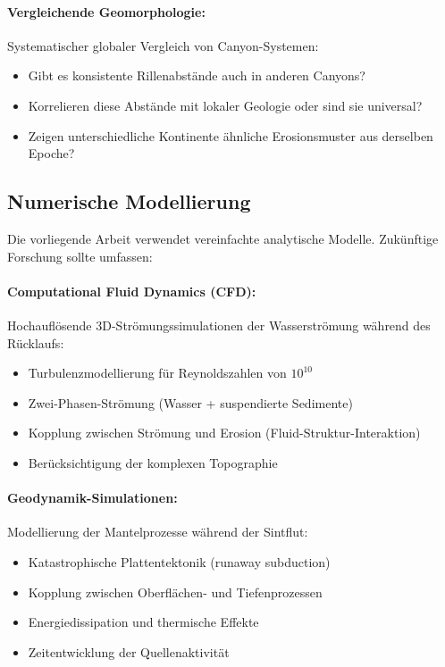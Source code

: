 ﻿\documentclass[12pt,a4paper]{report}
\begin{document}
\paragraph{Vergleichende Geomorphologie:}
Systematischer globaler Vergleich von Canyon-Sys\-temen:
\begin{itemize}
	\item Gibt es konsistente Rillenabstände auch in anderen Canyons?
	\item Korrelieren diese Abstände mit lokaler Geologie oder sind sie universal?
	\item Zeigen unterschiedliche Kontinente ähnliche Erosionsmuster aus derselben Epoche?
\end{itemize}

\subsection{Numerische Modellierung}

Die vorliegende Arbeit verwendet vereinfachte analytische Modelle. Zukünftige Forschung sollte umfassen:

\paragraph{Computational Fluid Dynamics (CFD):}
Hochauflösende 3D-Strömungssimulationen der Wasserströmung während des Rücklaufs:
\begin{itemize}
	\item Turbulenzmodellierung für Reynoldszahlen von $10^{10}$
	\item Zwei-Phasen-Strömung (Wasser + suspendierte Sedimente)
	\item Kopplung zwischen Strömung und Erosion (Fluid-Struktur-Interaktion)
	\item Berücksichtigung der komplexen Topographie
\end{itemize}

\paragraph{Geodynamik-Simulationen:}
Modellierung der Mantelprozesse während der Sintflut:
\begin{itemize}
	\item Katastrophische Plattentektonik (\glqq runaway subduction\grqq)
	\item Kopplung zwischen Oberflächen- und Tiefenprozessen
	\item Energiedissipation und thermische Effekte
	\item Zeitentwicklung der Quellenaktivität
\end{itemize}
\end{document}
